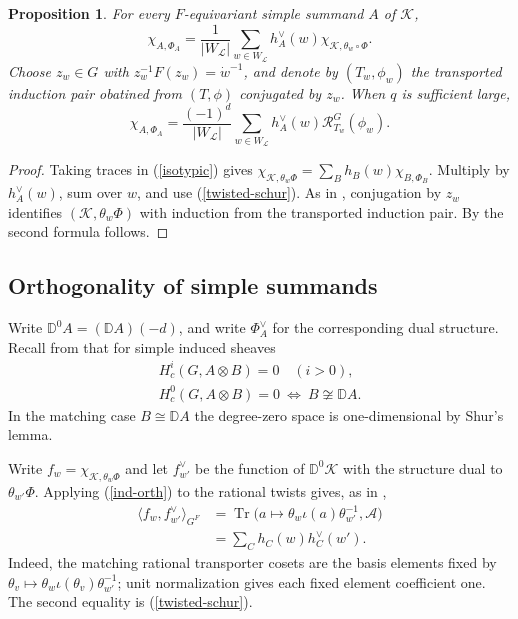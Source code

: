 \documentclass[11pt,letterpaper]{amsart}
\newtheorem{proposition}[theorem]{Proposition}
\theoremstyle{definition}
\numberwithin{equation}{section}
\numberwithin{theorem}{section}
\begin{document}
\begin{proposition}\label{fourier-prop}
For every $F$-equivariant simple summand $A$ of $\mathcal{K}$,
\begin{equation}\label{fourier}
 \chi_{A,\Phi_A}
 =\frac1{|W_{\mathcal L}|}\sum_{w\in W_{\mathcal L}}
          h_A^\vee(w)\chi_{\mathcal K,\theta_w\circ\Phi}.
\end{equation}
Choose $z_w\in G$ with $z_w^{-1}F(z_w)=\dot w^{-1}$, and denote
by $(T_w,\phi_w)$ the transported induction pair obatined from $(T,\phi)$ conjugated by $z_w$.
When $q$ is sufficient large,
\begin{equation}\label{DL-fourier}
 \chi_{A,\Phi_A}
 =\frac{(-1)^d}{|W_{\mathcal L}|}\sum_{w\in W_{\mathcal L}}
                         h_A^\vee(w)\mathcal R_{T_w}^G(\phi_w).
\end{equation}
\end{proposition}
\begin{proof}
Taking traces in (\ref{isotypic}) gives
$\chi_{\mathcal K,\theta_w\Phi}=\sum_Bh_B(w)\chi_{B,\Phi_B}$.
Multiply by $h_A^\vee(w)$, sum over $w$, and use
(\ref{twisted-schur}). As in \cite[\S10.6]{Lus_Ch2}, conjugation
by $z_w$ identifies $(\mathcal K,\theta_w\Phi)$ with induction
from the transported induction pair. By  the second
formula follows.
\end{proof}

\subsection{Orthogonality of simple summands}
Write $\mathbb D^0A=(\mathbb DA)(-d)$, and
write $\Phi_A^\vee$ for the corresponding dual structure. Recall
from \cite[\S7.4]{Lus_Ch2} that for simple induced sheaves
\begin{equation}\label{geom-orth}
\begin{gathered}
 H_c^i(G,A\otimes B)=0\quad(i>0),\\
 H_c^0(G,A\otimes B)=0\ \Longleftrightarrow\ B\not\cong\mathbb DA.
\end{gathered}
\end{equation}
In the matching case $B\cong\mathbb{D}A$ the degree-zero space is one-dimensional by Shur's lemma.

Write $f_w=\chi_{\mathcal K,\theta_w\Phi}$ and let $f_{w'}^\vee$
be the function of $\mathbb D^0\mathcal K$ with the structure
dual to $\theta_{w'}\Phi$. Applying (\ref{ind-orth}) to the rational
twists gives, as in \cite[\S10.6]{Lus_Ch2},
\begin{equation}\label{twisted-pairing}
\begin{aligned}
 \langle f_w,f_{w'}^\vee\rangle_{G^F}
 &=\operatorname{Tr}\bigl(a\mapsto\theta_w\iota(a)\theta_{w'}^{-1},
                         \mathscr A\bigr)\\
 &=\sum_C h_C(w)h_C^\vee(w').
\end{aligned}
\end{equation}
Indeed, the matching rational transporter cosets are the basis
elements fixed by $\theta_v\mapsto\theta_w\iota(\theta_v)\theta_{w'}^{-1}$;
unit normalization gives each fixed element coefficient one.
The second equality is (\ref{twisted-schur}).
\end{document}
